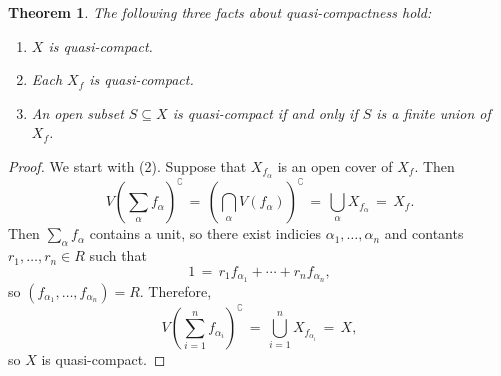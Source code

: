 \documentclass[11pt]{article}
\newtheorem{theorem}{Theorem}
\begin{document}
\begin{adjustwidth}{0.5cm}{}
  \begin{theorem}
    The following three facts about quasi-compactness hold:
    \begin{enumerate}
      \item $X$ is quasi-compact.
      \item Each $X_{f}$ is quasi-compact.
      \item An open subset $S \subseteq X$ is quasi-compact if and only if $S$ is a finite union of $X_{f}$.
    \end{enumerate}
  \end{theorem}
  \begin{proof}
    We start with (2). Suppose that $X_{f_{\alpha}}$ is an open cover of $X_{f}$. Then 
    \[
      V \left( \sum\limits_{\alpha} f_{\alpha}  \right)^{\complement} \, = \, \left( \bigcap\limits_{\alpha} V(f_{\alpha}) \right)^{\complement} \, = \, \bigcup\limits_{\alpha} X_{f_{\alpha}} \, = \, X_{f}.
    \]
    Then $\sum\limits_{\alpha} f_{\alpha}$ contains a unit, so there exist indicies $\alpha_{1}, \ldots, \alpha_{n}$ and contants $r_{1}, \ldots, r_{n} \in R$ such that
    \[
      1 \, = \, r_{1} f_{\alpha_{1}} + \cdots + r_{n} f_{\alpha_{n}},
    \]
    so $(f_{\alpha_{1}}, \ldots, f_{\alpha_{n}}) = R$. Therefore,
    \[
      V \left( \sum\limits_{i = 1}^{n} f_{\alpha_{i}} \right)^{\complement} \, = \, \bigcup\limits_{i = 1}^{n} X_{f_{\alpha_{i}}} \, = \, X,
    \]
    so $X$ is quasi-compact.
  \end{proof}
\end{adjustwidth}

\end{document}
